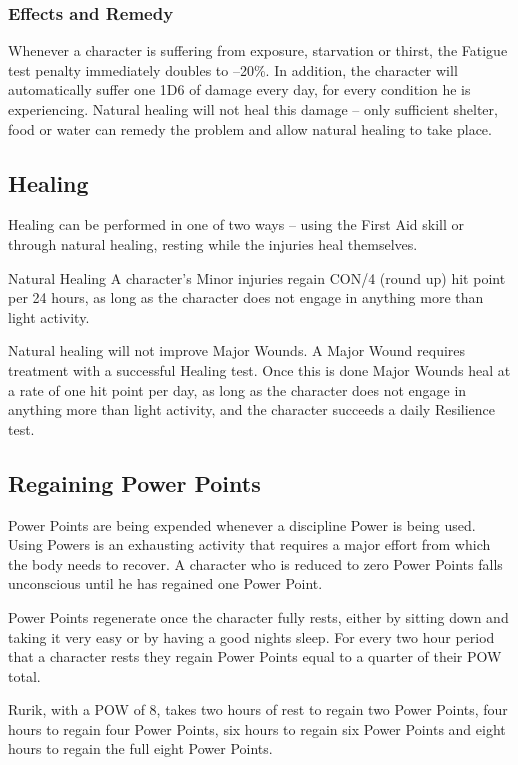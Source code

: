 \subsubsection{Effects and Remedy}
Whenever a character is suffering from exposure, starvation or thirst, the Fatigue test penalty immediately doubles to –20\%. In addition, the character will automatically suffer one 1D6 of damage every day, for every condition he is experiencing. Natural healing will not heal this damage – only sufficient shelter, food or water can remedy the problem and allow natural healing to take place. 


\subsection{Healing}
Healing can be performed in one of two ways – using the First Aid skill or through natural healing, resting while the injuries heal themselves. 

Natural Healing 
A character’s Minor injuries regain CON/4 (round up) hit point per 24 hours, as long as the character does not engage in anything more than light activity. 

Natural healing will not improve Major Wounds. A Major Wound requires treatment with a successful Healing test. Once this is done Major Wounds heal at a rate of one hit point per day, as long as the character does not engage in anything more than light activity, and the character succeeds a daily Resilience test. 

\subsection{Regaining Power Points}
Power Points are being expended whenever a discipline Power is being used. Using Powers is an exhausting activity that requires a major effort from which the body needs to recover. A character who is reduced to zero Power Points falls unconscious until he has regained one Power Point. 

Power Points regenerate once the character fully rests, either by sitting down and taking it very easy or by having a good nights sleep.
For every two hour period that a character rests they regain Power Points equal to a quarter of their POW total. 

\begin{rpg-examplebox}
Rurik, with a POW of 8, takes two hours of rest to regain two Power Points, four hours to regain four Power Points, six hours to regain six Power Points and eight hours to regain the full eight Power Points. 
\end{rpg-examplebox}

